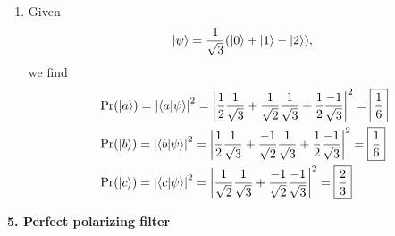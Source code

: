 \documentclass{article}
\theoremstyle{definition}
\newcommand{\f}[2]{\frac{#1}{#2}}
\begin{document}
\begin{enumerate}[label=(\alph*)]
	
	
	\item Given 
	\begin{align*}
		\ket{\psi} = \f{1}{\sqrt{3}} (\ket{0} + \ket{1} - \ket{2}),
	\end{align*}
	we find 
	\begin{align*}
		&\Pr(\ket{a}) = \abs{\bra{a}\ket{\psi}}^2 = \abs{ \f{1}{2}\f{1}{\sqrt{3}} + \f{1}{\sqrt{2}}\f{1}{\sqrt{3}} + \f{1}{2}\f{-1}{\sqrt{3}}}^2 = \boxed{\f{1}{6}} \\
		&\Pr(\ket{b}) = \abs{\bra{b}\ket{\psi}}^2 = \abs{ \f{1}{2}\f{1}{\sqrt{3}} + \f{-1}{\sqrt{2}}\f{1}{\sqrt{3}} + \f{1}{2}\f{-1}{\sqrt{3}}}^2 = \boxed{\f{1}{6}}  \\
		&\Pr(\ket{c}) = \abs{\bra{c}\ket{\psi}}^2 = \abs{\f{1}{\sqrt{2}}\f{1}{\sqrt{3}} +\f{-1}{\sqrt{2}}\f{-1}{\sqrt{3}}  }^2 = \boxed{\f{2}{3}} 
	\end{align*}
\end{enumerate}

\noindent \textbf{5. Perfect polarizing filter } 
\end{document}
